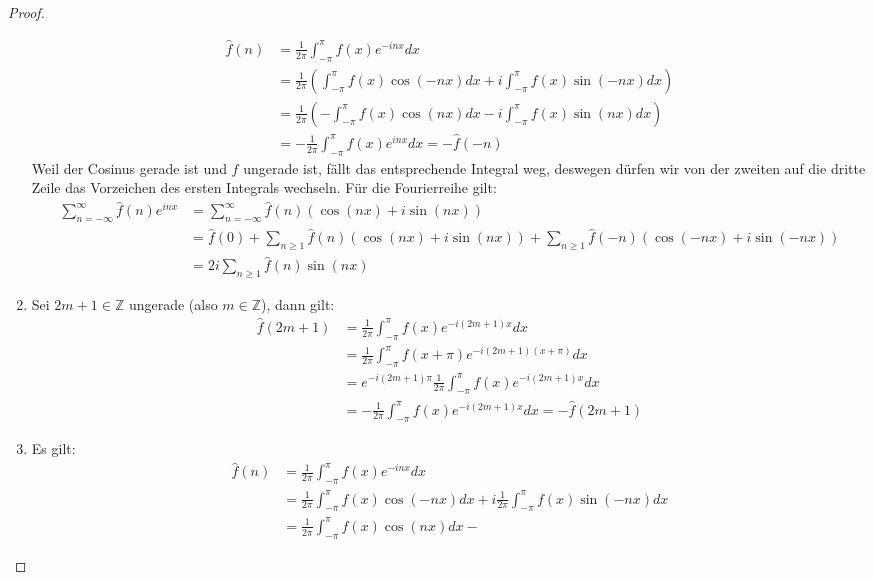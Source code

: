 \documentclass[11pt]{article}
\newcommand{\Z}{\mathbb{Z}}
\begin{document}
\begin{proof}
\begin{enumerate}[label = (\alph*)]
        $$\begin{aligned}
              \hat{f}(n) &= \frac{1}{2\pi}\int_{-\pi}^{\pi} f(x)e^{-inx}dx \\
              &=\frac{1}{2\pi}\left(\int_{-\pi}^{\pi}f(x)\cos(-nx)dx +
              i\int_{-\pi}^{\pi}f(x)\sin(-nx)dx\right) \\
              &= \frac{1}{2\pi}\left(-\int_{-\pi}^{\pi}f(x)\cos(nx) dx-
              i\int_{-\pi}^{\pi}f(x)\sin(nx)dx\right)\\
              &= -\frac{1}{2\pi}\int_{-\pi}^{\pi} f(x)e^{inx}dx = -\hat{f}(-n)
        \end{aligned}$$
        Weil der Cosinus gerade ist und $f$ ungerade ist, fällt das entsprechende Integral weg,
        deswegen dürfen wir von der zweiten auf die dritte Zeile das Vorzeichen des ersten
        Integrals wechseln.
        Für die Fourierreihe gilt:
        $$\begin{aligned}
              \sum_{n=-\infty}^{\infty}\hat{f}(n)e^{inx}
              &=\sum_{n=-\infty}^{\infty}\hat{f}(n)(\cos(nx) + i\sin(nx))\\
              &= \hat{f}(0) + \sum_{n\geq 1}\hat{f}(n)(\cos(nx) + i\sin(nx)) +
              \sum_{n\geq 1}\hat{f}(-n)(\cos(-nx) + i\sin(-nx))\\
              &=2i\sum_{n\geq 1}\hat{f}(n)\sin(nx)
        \end{aligned}$$
        \item Sei $2m+1\in\Z$ ungerade (also $m\in\Z$), dann gilt:
        $$\begin{aligned}
              \hat{f}(2m+1) &= \frac{1}{2\pi}\int_{-\pi}^{\pi} f(x)e^{-i(2m+1)x}dx \\&=
              \frac{1}{2\pi}\int_{-\pi}^{\pi} f(x+\pi)e^{-i(2m+1)(x+\pi)}dx\\&=
              e^{-i(2m+1)\pi}\frac{1}{2\pi}\int_{-\pi}^{\pi} f(x)e^{-i(2m+1)x}dx\\
              &= -\frac{1}{2\pi}\int_{-\pi}^{\pi} f(x)e^{-i(2m+1)x}dx=-\hat{f}(2m+1)
        \end{aligned}$$
        \item Es gilt:
        $$\begin{aligned}
              \hat{f}(n) &= \frac{1}{2\pi}\int_{-\pi}^{\pi} f(x)e^{-inx}dx \\
              &=\frac{1}{2\pi}\int_{-\pi}^{\pi} f(x)\cos(-nx)dx+
              i\frac{1}{2\pi}\int_{-\pi}^{\pi} f(x)\sin(-nx)dx\\
              &= \frac{1}{2\pi}\int_{-\pi}^{\pi} f(x)\cos(nx)dx-

\end{aligned}$$
\end{enumerate}
\end{proof}
\end{document}
